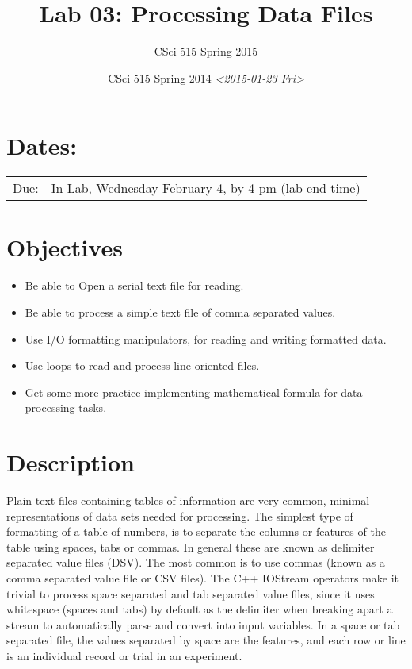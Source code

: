 \documentclass[11pt]{article}
\author{CSci 515 Spring 2015}
\date{CSci 515 Spring 2014 \textit{<2015-01-23 Fri>}}
\title{Lab 03: Processing Data Files}
\begin{document}
\maketitle

\section*{Dates:}
\label{sec-1}
\begin{center}
\begin{tabular}{ll}
Due: & In Lab, Wednesday February 4, by 4 pm (lab end time)\\
\end{tabular}
\end{center}
\section*{Objectives}
\label{sec-2}
\begin{itemize}
\item Be able to Open a serial text file for reading.
\item Be able to process a simple text file of comma separated values.
\item Use I/O formatting manipulators, for reading and writing formatted data.
\item Use loops to read and process line oriented files.
\item Get some more practice implementing mathematical formula for data processing tasks.
\end{itemize}
\section*{Description}
\label{sec-3}
Plain text files containing tables of information are very common,
minimal representations of data sets needed for processing.  The
simplest type of formatting of a table of numbers, is to separate the
columns or features of the table using spaces, tabs or commas. In
general these are known as delimiter separated value files (DSV).  The
most common is to use commas (known as a comma separated value file or
CSV files).  The C++ IOStream operators make it trivial to process
space separated and tab separated value files, since it uses
whitespace (spaces and tabs) by default as the delimiter when breaking
apart a stream to automatically parse and convert into input
variables. In a space or tab separated file, the values separated by
space are the features, and each row or line is an individual record
or trial in an experiment.
\end{document}
